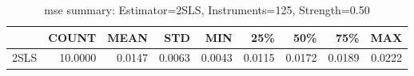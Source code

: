 \begin{table}[ht]
\centering
\caption{mse summary: Estimator=2SLS, Instruments=125, Strength=0.50}
\begin{tabular}{lrrrrrrrr}
\toprule
 & COUNT & MEAN & STD & MIN & 25\% & 50\% & 75\% & MAX \\
\midrule
2SLS & 10.0000 & 0.0147 & 0.0063 & 0.0043 & 0.0115 & 0.0172 & 0.0189 & 0.0222 \\
\bottomrule
\end{tabular}
\end{table}
